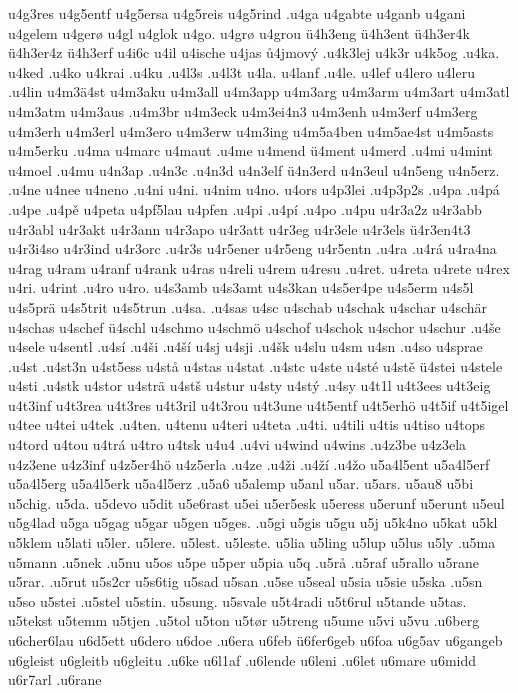 {{u4g3res
u4g5entf
u4g5ersa
u4g5reis
u4g5rind
.u4ga
u4gabte
u4ganb
u4gani
u4gelem
u4gerø
u4gl
u4glok
u4go.
u4grø
u4grou
ü4h3eng
ü4h3ent
ü4h3er4k
ü4h3er4z
ü4h3erf
u4i6c
u4il
u4ische
u4jas
ů4jmový
.u4k3lej
u4k3r
u4k5og
.u4ka.
u4ked
.u4ko
u4krai
.u4ku
.u4l3s
.u4l3t
u4la.
u4lanf
.u4le.
u4lef
u4lero
u4leru
.u4lin
u4m3ä4st
u4m3aku
u4m3all
u4m3app
u4m3arg
u4m3arm
u4m3art
u4m3atl
u4m3atm
u4m3aus
.u4m3br
u4m3eck
u4m3ei4n3
u4m3enh
u4m3erf
u4m3erg
u4m3erh
u4m3erl
u4m3ero
u4m3erw
u4m3ing
u4m5a4ben
u4m5ae4st
u4m5asts
u4m5erku
.u4ma
u4marc
u4maut
.u4me
u4mend
ü4ment
u4merd
.u4mi
u4mint
u4moel
.u4mu
u4n3ap
.u4n3c
.u4n3d
u4n3elf
ü4n3erd
u4n3eul
u4n5eng
u4n5erz.
.u4ne
u4nee
u4neno
.u4ni
u4ni.
u4nim
u4no.
u4ors
u4p3lei
.u4p3p2s
.u4pa
.u4pá
.u4pe
.u4pě
u4peta
u4pf5lau
u4pfen
.u4pi
.u4pí
.u4po
.u4pu
u4r3a2z
u4r3abb
u4r3abl
u4r3akt
u4r3ann
u4r3apo
u4r3att
u4r3eg
u4r3ele
u4r3els
ü4r3en4t3
u4r3i4so
u4r3ind
u4r3orc
.u4r3s
u4r5ener
u4r5eng
u4r5entn
.u4ra
.u4rá
u4ra4na
u4rag
u4ram
u4ranf
u4rank
u4ras
u4reli
u4rem
u4resu
.u4ret.
u4reta
u4rete
u4rex
u4ri.
u4rint
.u4ro
u4ro.
u4s3amb
u4s3amt
u4s3kan
u4s5er4pe
u4s5erm
u4s5l
u4s5prä
u4s5trit
u4s5trun
.u4sa.
.u4sas
u4sc
u4schab
u4schak
u4schar
u4schär
u4schas
u4schef
ü4schl
u4schmo
u4schmö
u4schof
u4schok
u4schor
u4schur
.u4še
u4sele
u4sentl
.u4sí
.u4ši
.u4ší
u4sj
u4sji
.u4šk
u4slu
u4sm
u4sn
.u4so
u4sprae
.u4st
.u4st3n
u4st5ess
u4stå
u4stas
u4stat
.u4stc
u4ste
u4sté
u4stě
ü4stei
u4stele
u4sti
.u4stk
u4stor
u4strä
u4stš
u4stur
u4sty
u4stý
.u4sy
u4t1l
u4t3ees
u4t3eig
u4t3inf
u4t3rea
u4t3res
u4t3ril
u4t3rou
u4t3une
u4t5entf
u4t5erhö
u4t5if
u4t5igel
u4tee
u4tei
u4tek
.u4ten.
u4tenu
u4teri
u4teta
.u4ti.
u4tili
u4tis
u4tiso
u4tops
u4tord
u4tou
u4trá
u4tro
u4tsk
u4u4
.u4vi
u4wind
u4wins
.u4z3be
u4z3ela
u4z3ene
u4z3inf
u4z5er4hö
u4z5erla
.u4ze
.u4ži
.u4ží
.u4žo
u5a4l5ent
u5a4l5erf
u5a4l5erg
u5a4l5erk
u5a4l5erz
.u5a6
u5alemp
u5anl
u5ar.
u5ars.
u5au8
u5bi
u5chig.
u5da.
u5devo
u5dit
u5e6rast
u5ei
u5er5esk
u5eress
u5erunf
u5erunt
u5eul
u5g4lad
u5ga
u5gag
u5gar
u5gen
u5ges.
.u5gi
u5gis
u5gu
u5j
u5k4no
u5kat
u5kl
u5klem
u5lati
u5ler.
u5lere.
u5lest.
u5leste.
u5lia
u5ling
u5lup
u5lus
u5ly
.u5ma
u5mann
.u5nek
.u5nu
u5os
u5pe
u5per
u5pia
u5q
.u5rå
.u5raf
u5rallo
u5rane
u5rar.
.u5rut
u5s2cr
u5s6tig
u5sad
u5san
.u5se
u5seal
u5sia
u5sie
u5ska
.u5sn
u5so
u5stei
.u5stel
u5stin.
u5sung.
u5svale
u5t4radi
u5t6rul
u5tande
u5tas.
u5tekst
u5temm
u5tjen
.u5tol
u5ton
u5tør
u5treng
u5ume
u5vi
u5vu
.u6berg
u6cher6lau
u6d5ett
u6dero
u6doe
.u6era
u6feb
ü6fer6geb
u6foa
u6g5av
u6gangeb
u6gleist
u6gleitb
u6gleitu
.u6ke
u6l1af
.u6lende
u6leni
.u6let
u6mare
u6midd
u6r7arl
.u6rane
}}
